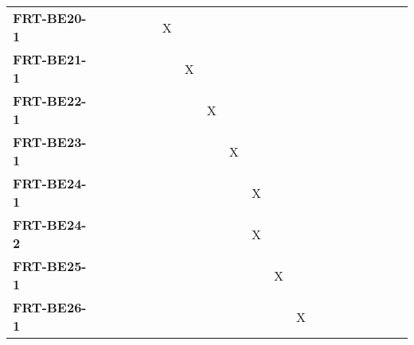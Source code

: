 \documentclass[12pt, titlepage]{article}
\begin{document}
\begin{landscape}
\begin{longtable}{|l|ccccccccccccccc|}
		\textbf{FRT-BE20-1} & ~                                                         & ~             & ~             & X             & ~             & ~             & ~             & ~             & ~             & ~             & ~             & ~             & ~             & ~             & ~             \\
		\textbf{FRT-BE21-1} & ~                                                         & ~             & ~             & ~             & X             & ~             & ~             & ~             & ~             & ~             & ~             & ~             & ~             & ~             & ~             \\
		\textbf{FRT-BE22-1} & ~                                                         & ~             & ~             & ~             & ~             & X             & ~             & ~             & ~             & ~             & ~             & ~             & ~             & ~             & ~             \\
		\textbf{FRT-BE23-1} & ~                                                         & ~             & ~             & ~             & ~             & ~             & X             & ~             & ~             & ~             & ~             & ~             & ~             & ~             & ~             \\
		\textbf{FRT-BE24-1} & ~                                                         & ~             & ~             & ~             & ~             & ~             & ~             & X             & ~             & ~             & ~             & ~             & ~             & ~             & ~             \\
		\textbf{FRT-BE24-2} & ~                                                         & ~             & ~             & ~             & ~             & ~             & ~             & X             & ~             & ~             & ~             & ~             & ~             & ~             & ~             \\
		\textbf{FRT-BE25-1} & ~                                                         & ~             & ~             & ~             & ~             & ~             & ~             & ~             & X             & ~             & ~             & ~             & ~             & ~             & ~             \\
		\textbf{FRT-BE26-1} & ~                                                         & ~             & ~             & ~             & ~             & ~             & ~             & ~             & ~             & X             & ~             & ~             & ~             & ~             & ~             \\

\end{longtable}
\end{landscape}
\end{document}
